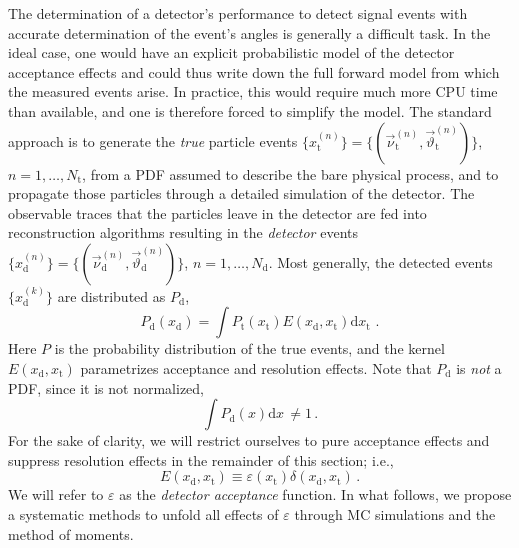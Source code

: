 \documentclass[aps,prd,reprint,nofootinbib,preprintnumbers]{revtex4}
\newcommand{\rmdx}[1]{\mbox{d} #1 \,} %
\renewcommand{\theta}{\vartheta}
\let\eps\varepsilon
\begin{document}
The determination of a detector's performance to detect signal events
with accurate determination of the event's angles is generally a difficult
task. In the ideal case, one would have an explicit probabilistic model of
the detector acceptance effects and could thus write down the full
forward model from which the measured events arise. In practice, this
would require much more CPU time than available, and one is therefore
forced to simplify the model. The standard approach is to generate
the \emph{true} particle events $\lbrace x_\text{t}^{(n)}\rbrace =
\lbrace(\vec{\nu}^{(n)}_\text{t},\vec\theta^{(n)}_\text{t})\rbrace$, $n=1,\dots,N_\text{t}$, from a PDF
assumed to describe the bare physical process, and to propagate those
particles through a detailed simulation of the detector.
The observable traces that the particles leave in the detector are fed
into reconstruction algorithms resulting in the \emph{detector} events
$\lbrace x^{(n)}_\text{d}\rbrace = \lbrace(\vec{\nu}^{(n)}_\text{d},
\vec\theta^{(n)}_\text{d})\rbrace$, $n=1,\dots,N_\text{d}$.
Most generally, the detected events $\lbrace x_\text{d}^{(k)}\rbrace$
are distributed as $P_\text{d}$,
\begin{equation}
    P_\text{d}(x_\text{d}) = \int P_\text{t}(x_\text{t}) E(x_\text{d}, x_\text{t}) \rmdx{x_\text{t}}\,.
\end{equation}
Here $P$ is the probability distribution of the true events, and the kernel $E(x_\text{d}, x_\text{t})$
parametrizes acceptance and resolution
effects. Note that $P_\text{d}$ is \emph{not} a PDF, since it is not normalized,
\begin{equation}
    \int P_\text{d}(x) \rmdx{x} \neq 1\,.
\end{equation}
For the sake of clarity, we will restrict ourselves
to pure acceptance effects and suppress resolution effects in the remainder of this section; i.e.,
\begin{equation}
    E(x_\text{d}, x_\text{t}) \equiv \eps(x_\text{t}) \delta(x_\text{d}, x_\text{t})\,.
\end{equation}
We will refer to $\eps$ as the \emph{detector acceptance} function. In what follows,
we propose a systematic methods to unfold all effects of $\eps$ through MC simulations
and the method of moments.\\
\end{document}
